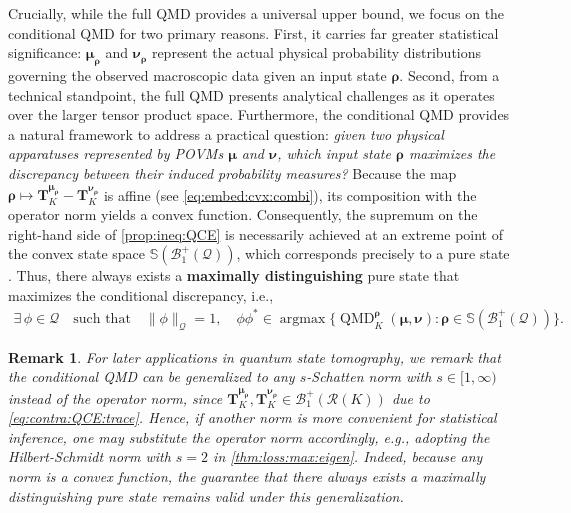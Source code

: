 \documentclass[noinfoline]{imsart}\setcounter{tocdepth}{2}
\renewcommand{\b}[1]{\mathbb{#1}} %
\newcommand{\m}[1]{\mathbf{#1}} %
\renewcommand{\c}[1]{\mathcal{#1}} %
\newcommand{\mb}[1]{\boldsymbol{#1}} %
\newcommand{\QMD}{\operatorname{QMD}}
\DeclareMathOperator*{\argmax}{\arg\max}
\theoremstyle{plain}
\newtheorem{remark}[theorem]{Remark}
\begin{document}
Crucially, while the full QMD provides a universal upper bound, we focus on the conditional QMD for two primary reasons. First, it carries far greater statistical significance: $\mb{\mu}_{\mb{\rho}}$ and $\mb{\nu}_{\mb{\rho}}$ represent the actual physical probability distributions governing the observed macroscopic data given an input state $\mb{\rho}$. Second, from a technical standpoint, the full QMD presents analytical challenges as it operates over the larger tensor product space.
Furthermore, the conditional QMD provides a natural framework to address a practical question: \emph{given two physical apparatuses represented by POVMs $\mb{\mu}$ and $\mb{\nu}$, which input state $\mb{\rho}$ maximizes the discrepancy between their induced probability measures?} Because the map $\mb{\rho} \mapsto \m{T}_{K}^{\mb{\mu}_{\mb{\rho}}} - \m{T}_{K}^{\mb{\nu}_{\mb{\rho}}}$ is affine (see \eqref{eq:embed:cvx:combi}), its composition with the operator norm yields a convex function. Consequently, the supremum on the right-hand side of \cref{prop:ineq:QCE} is necessarily achieved at an extreme point of the convex state space $\b{S}(\c{B}_{1}^{+}(\c{Q}))$, which corresponds precisely to a pure state \cite{holevo2011probabilistic}. Thus, there always exists a \textbf{maximally distinguishing} pure state that maximizes the conditional discrepancy, i.e.,
\begin{align*}
    \exists \, \phi \in \c{Q} \quad \text{such that} \quad \|\phi\|_{\c{Q}}=1, \quad \phi \phi^{*} \in \argmax \{\QMD_{K}^{\mb{\rho}}(\mb{\mu}, \mb{\nu}) : \mb{\rho} \in \b{S}(\c{B}_{1}^{+}(\c{Q})) \}.
\end{align*}
\begin{remark}\label{rmk:QMD:schatten}
For later applications in quantum state tomography, we remark that the conditional QMD can be generalized to any $s$-Schatten norm with $s \in [1, \infty)$ instead of the operator norm, since $\m{T}_{K}^{\mb{\mu}_{\mb{\rho}}}, \m{T}_{K}^{\mb{\nu}_{\mb{\rho}}} \in \c{B}_{1}^{+}(\c{R}(K))$ due to \eqref{eq:contra:QCE:trace}. Hence, if another norm is more convenient for statistical inference, one may substitute the operator norm accordingly, e.g., adopting the Hilbert-Schmidt norm with $s=2$ in \cref{thm:loss:max:eigen}. Indeed, because any norm is a convex function, the guarantee that there always exists a maximally distinguishing pure state remains valid under this generalization.
\end{remark}
\end{document}

